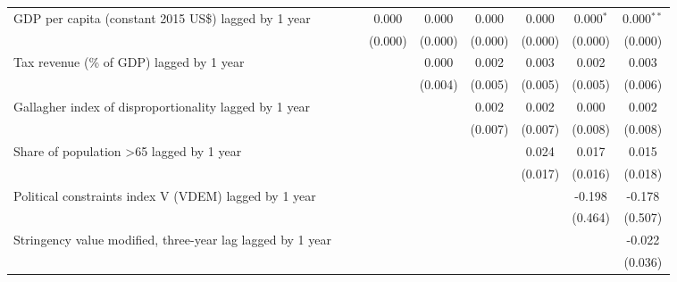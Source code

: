 \begin{tabular}{lcccccccc}
   GDP per capita (constant 2015 US\$) lagged by 1 year       &                &                & 0.000          & 0.000          & 0.000         & 0.000         & 0.000$^{*}$   & 0.000$^{**}$\\   
                                                              &                &                & (0.000)        & (0.000)        & (0.000)       & (0.000)       & (0.000)       & (0.000)\\   
   Tax revenue (\% of GDP) lagged by 1 year                   &                &                &                & 0.000          & 0.002         & 0.003         & 0.002         & 0.003\\   
                                                              &                &                &                & (0.004)        & (0.005)       & (0.005)       & (0.005)       & (0.006)\\   
   Gallagher index of disproportionality lagged by 1 year     &                &                &                &                & 0.002         & 0.002         & 0.000         & 0.002\\   
                                                              &                &                &                &                & (0.007)       & (0.007)       & (0.008)       & (0.008)\\   
   Share of population >65 lagged by 1 year                   &                &                &                &                &               & 0.024         & 0.017         & 0.015\\   
                                                              &                &                &                &                &               & (0.017)       & (0.016)       & (0.018)\\   
   Political constraints index V (VDEM) lagged by 1 year      &                &                &                &                &               &               & -0.198        & -0.178\\   
                                                              &                &                &                &                &               &               & (0.464)       & (0.507)\\   
   Stringency value modified, three-year lag lagged by 1 year &                &                &                &                &               &               &               & -0.022\\   
                                                              &                &                &                &                &               &               &               & (0.036)\\   

\end{tabular}
